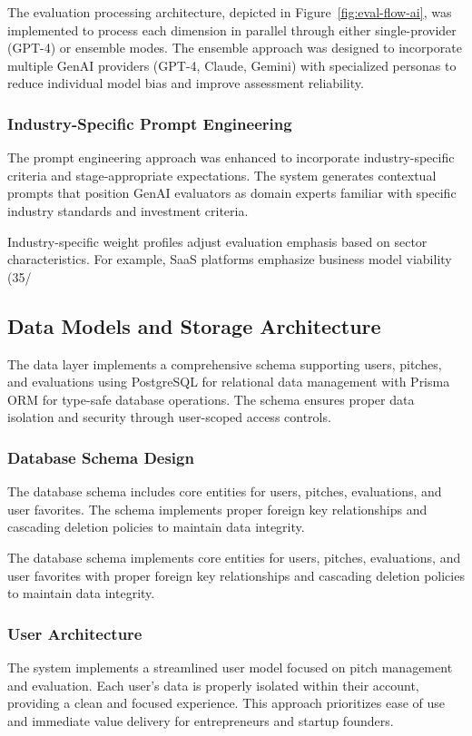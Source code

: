 The evaluation processing architecture, depicted in Figure~\ref{fig:eval-flow-ai}, was implemented to process each dimension in parallel through either single-provider (GPT-4) or ensemble modes. The ensemble approach was designed to incorporate multiple GenAI providers (GPT-4, Claude, Gemini) with specialized personas to reduce individual model bias and improve assessment reliability.

\subsubsection{Industry-Specific Prompt Engineering}
The prompt engineering approach was enhanced to incorporate industry-specific criteria and stage-appropriate expectations. The system generates contextual prompts that position GenAI evaluators as domain experts familiar with specific industry standards and investment criteria.

Industry-specific weight profiles adjust evaluation emphasis based on sector characteristics. For example, SaaS platforms emphasize business model viability (35/%

\subsection{Data Models and Storage Architecture}\label{subsec:data-models-and-storage-architecture}
The data layer implements a comprehensive schema supporting users, pitches, and evaluations using PostgreSQL for relational data management with Prisma ORM for type-safe database operations. The schema ensures proper data isolation and security through user-scoped access controls.

\subsubsection{Database Schema Design}
The database schema includes core entities for users, pitches, evaluations, and user favorites. The schema implements proper foreign key relationships and cascading deletion policies to maintain data integrity.

The database schema implements core entities for users, pitches, evaluations, and user favorites with proper foreign key relationships and cascading deletion policies to maintain data integrity.

\subsubsection{User Architecture}
The system implements a streamlined user model focused on pitch management and evaluation. Each user's data is properly isolated within their account, providing a clean and focused experience. This approach prioritizes ease of use and immediate value delivery for entrepreneurs and startup founders.

